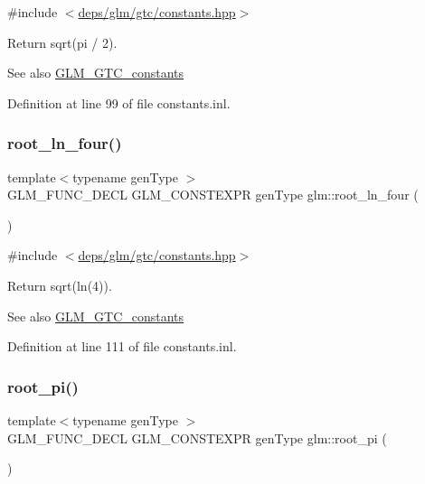 {\ttfamily \#include $<$\hyperlink{constants_8hpp}{deps/glm/gtc/constants.\+hpp}$>$}

Return sqrt(pi / 2). \begin{DoxySeeAlso}{See also}
\hyperlink{group__gtc__constants}{G\+L\+M\+\_\+\+G\+T\+C\+\_\+constants} 
\end{DoxySeeAlso}


Definition at line 99 of file constants.\+inl.

\mbox{\label{group__gtc__constants_ga4129412e96b33707a77c1a07652e23e2}} 
\subsubsection{\texorpdfstring{root\+\_\+ln\+\_\+four()}{root\_ln\_four()}}
{\footnotesize\ttfamily template$<$typename gen\+Type $>$ \\
G\+L\+M\+\_\+\+F\+U\+N\+C\+\_\+\+D\+E\+CL G\+L\+M\+\_\+\+C\+O\+N\+S\+T\+E\+X\+PR gen\+Type glm\+::root\+\_\+ln\+\_\+four (\begin{DoxyParamCaption}{ }\end{DoxyParamCaption})}



{\ttfamily \#include $<$\hyperlink{constants_8hpp}{deps/glm/gtc/constants.\+hpp}$>$}

Return sqrt(ln(4)). \begin{DoxySeeAlso}{See also}
\hyperlink{group__gtc__constants}{G\+L\+M\+\_\+\+G\+T\+C\+\_\+constants} 
\end{DoxySeeAlso}


Definition at line 111 of file constants.\+inl.

\mbox{\label{group__gtc__constants_ga261380796b2cd496f68d2cf1d08b8eb9}} 
\subsubsection{\texorpdfstring{root\+\_\+pi()}{root\_pi()}}
{\footnotesize\ttfamily template$<$typename gen\+Type $>$ \\
G\+L\+M\+\_\+\+F\+U\+N\+C\+\_\+\+D\+E\+CL G\+L\+M\+\_\+\+C\+O\+N\+S\+T\+E\+X\+PR gen\+Type glm\+::root\+\_\+pi (\begin{DoxyParamCaption}{ }\end{DoxyParamCaption})}



